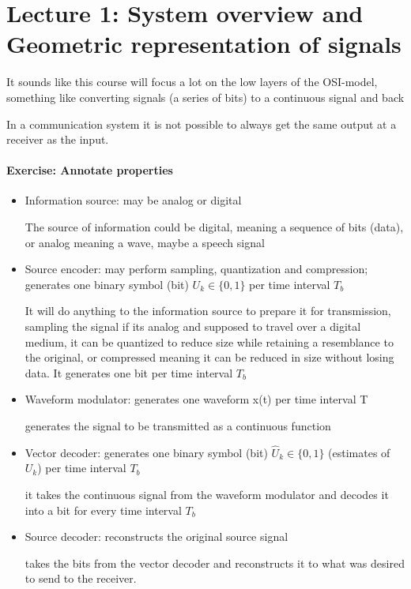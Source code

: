 \section*{Lecture 1: System overview and Geometric representation of signals }

It sounds like this course will focus a lot on the low layers of the OSI-model, something like converting signals (a series of bits) to a continuous signal and back

In a communication system it is not possible to always get the same output at a receiver as the input.

\paragraph{Exercise: Annotate properties}
\begin{itemize}
    \item Information source: may be analog or digital

    The source of information could be digital, meaning a sequence of bits (data), or analog meaning a wave, maybe a speech signal

    \item Source encoder: may perform sampling, quantization and compression; generates one binary symbol (bit) $U_k \in \{0, 1\}$ per time interval $T_b$

    It will do anything to the information source to prepare it for transmission, sampling the signal if its analog and supposed to travel over a digital medium, it can be quantized to reduce size while retaining a resemblance to the original, or compressed meaning it can be reduced in size without losing data. It generates one bit per time interval $T_b$

    \item Waveform modulator: generates one waveform x(t) per time interval T

    generates the signal to be transmitted as a continuous function

    \item Vector decoder: generates one binary symbol (bit) $\hat U_k \in \{0, 1\}$ (estimates of $U_k$) per time interval $T_b$

    it takes the continuous signal from the waveform modulator and decodes it into a bit for every time interval $T_b$

    \item Source decoder: reconstructs the original source signal

    takes the bits from the vector decoder and reconstructs it to what was desired to send to the receiver.
\end{itemize}